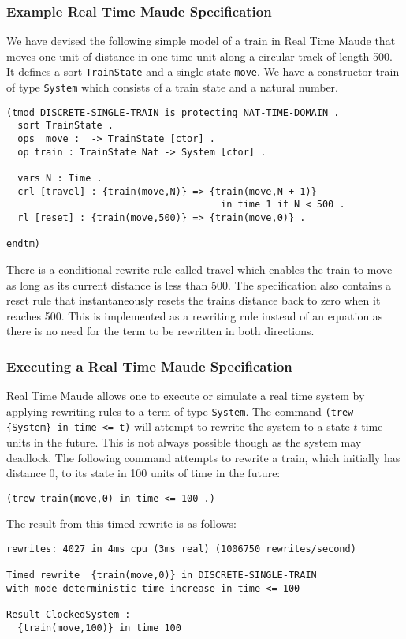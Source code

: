 \subsubsection*{Example Real Time Maude Specification}
We have devised the following simple model of a train in Real Time Maude that moves one unit of distance in one time unit along a circular track of length 500. It defines a sort \texttt{TrainState} and a single state \texttt{move}. We have a constructor train of type \texttt{System} which consists of a train state and a natural number.  
\medskip
\begin{lstlisting}
(tmod DISCRETE-SINGLE-TRAIN is protecting NAT-TIME-DOMAIN .
  sort TrainState .
  ops  move :  -> TrainState [ctor] .
  op train : TrainState Nat -> System [ctor] .
 
  vars N : Time .
  crl [travel] : {train(move,N)} => {train(move,N + 1)} 
                                      in time 1 if N < 500 .
  rl [reset] : {train(move,500)} => {train(move,0)} . 
         
endtm)
\end{lstlisting}
There is a conditional rewrite rule called travel which enables the train to move as long as its current distance is less than 500. The specification also contains a reset rule that instantaneously resets the trains distance back to zero when it reaches 500. This is implemented as a rewriting rule instead of an equation as there is no need for the term to be rewritten in both directions.


\subsubsection*{Executing a Real Time Maude Specification}
Real Time Maude allows one to execute or simulate a real time system by applying rewriting rules to a term of type \texttt{System}.
The command \texttt{(trew \{System\} in time <= t)} will attempt to rewrite the system to a state $t$ time units in the future. This is not always possible though as the system may deadlock. The following command attempts to rewrite a train, which initially has distance $0$, to its state in 100 units of time in the future: 
\begin{center}
\texttt{(trew {train(move,0)} in time <= 100 .)}
\end{center}

The result from this timed rewrite is as follows:
\begin{lstlisting}
rewrites: 4027 in 4ms cpu (3ms real) (1006750 rewrites/second)

Timed rewrite  {train(move,0)} in DISCRETE-SINGLE-TRAIN 
with mode deterministic time increase in time <= 100

Result ClockedSystem :
  {train(move,100)} in time 100
\end{lstlisting}

